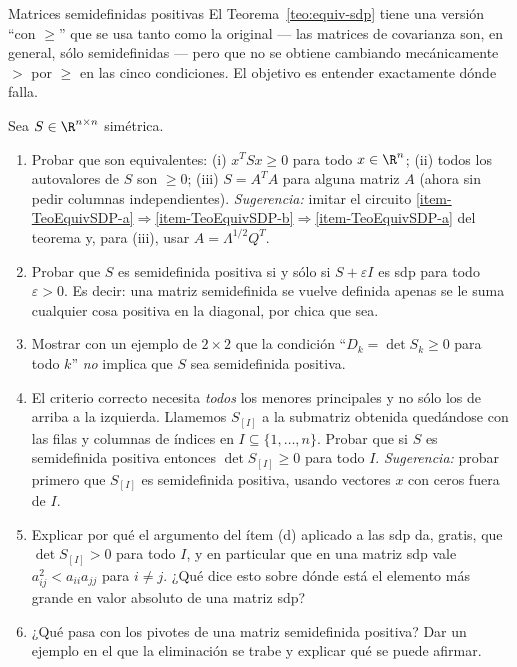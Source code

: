 \begin{entrega}{Matrices semidefinidas positivas}\label{ent:semidefinidas}
El Teorema~\ref{teo:equiv-sdp} tiene una versión ``con $\ge$'' que se usa tanto
como la original --- las matrices de covarianza son, en general, sólo
semidefinidas --- pero que no se obtiene cambiando mecánicamente $>$ por $\ge$
en las cinco condiciones. El objetivo es entender exactamente dónde falla.

Sea $S\in\R^{n\times n}$ simétrica.
\begin{enumerate}[label=\textbf{(\alph*)},itemsep=3pt,topsep=4pt]
\item Probar que son equivalentes: (i) $x^TSx\ge0$ para todo $x\in\R^n$;
(ii) todos los autovalores de $S$ son $\ge 0$; (iii) $S=A^TA$ para alguna
matriz $A$ (ahora sin pedir columnas independientes).
\emph{Sugerencia:} imitar el circuito
\ref{item-TeoEquivSDP-a}$\Rightarrow$\ref{item-TeoEquivSDP-b}$\Rightarrow$\ref{item-TeoEquivSDP-a}
del teorema y, para (iii), usar $A=\Lambda^{1/2}Q^T$.

\item Probar que $S$ es semidefinida positiva si y sólo si $S+\varepsilon I$ es
sdp para todo $\varepsilon>0$. Es decir: una matriz semidefinida se vuelve
definida apenas se le suma cualquier cosa positiva en la diagonal, por chica
que sea.

\item Mostrar con un ejemplo de $2\times2$ que la condición
``$D_k=\det S_k\ge 0$ para todo $k$'' \emph{no} implica que $S$ sea
semidefinida positiva.

\item El criterio correcto necesita \emph{todos} los menores principales y no
sólo los de arriba a la izquierda. Llamemos $S_{[I]}$ a la submatriz obtenida
quedándose con las filas y columnas de índices en $I\subseteq\{1,\dots,n\}$.
Probar que si $S$ es semidefinida positiva entonces $\det S_{[I]}\ge 0$ para
todo $I$. \emph{Sugerencia:} probar primero que $S_{[I]}$ es semidefinida
positiva, usando vectores $x$ con ceros fuera de $I$.

\item Explicar por qué el argumento del ítem (d) aplicado a las sdp da, gratis,
que $\det S_{[I]}>0$ para todo $I$, y en particular que en una matriz sdp vale
$a_{ij}^2 < a_{ii}a_{jj}$ para $i\neq j$. ¿Qué dice esto sobre dónde está el
elemento más grande en valor absoluto de una matriz sdp?

\item ¿Qué pasa con los pivotes de una matriz semidefinida positiva? Dar un
ejemplo en el que la eliminación se trabe y explicar qué se puede afirmar.
\end{enumerate}

\medskip
{}
\end{entrega}


